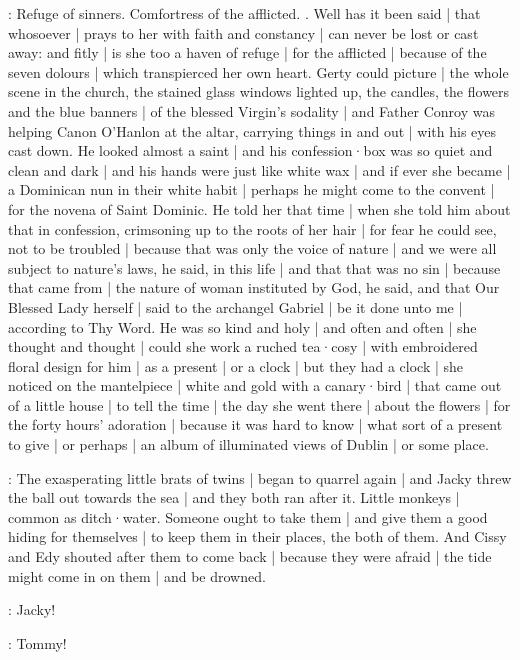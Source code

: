 :
Refuge of sinners.
Comfortress of the afflicted.
.
Well has it been said |
that whosoever |
prays to her with faith and constancy |
can never be lost or cast away:
and fitly |
is she too a haven of refuge |
for the afflicted |
because of the seven dolours |
which transpierced her own heart.
Gerty could picture |
the whole scene in the church,
the stained glass windows lighted up,
the candles,
the flowers
and the blue banners |
of the blessed Virgin's sodality |
and Father Conroy
was helping Canon O'Hanlon at the altar,
carrying things in and out |
with his eyes cast down.
He looked almost a saint |%
and his confession·box
was so quiet and clean and dark |
and his hands were just like white wax |
and if ever she became |
a Dominican nun in their white habit |
perhaps he might come to the convent |
for the novena of Saint Dominic.
He told her that time |
when she told him about that in confession,
crimsoning up to the roots of her hair |
for fear he could see,
not to be troubled |
because that was only the voice of nature |
and we were all subject to nature's laws,
he said,
in this life |
and that that was no sin |
because that came from |
the nature of woman instituted by God,
he said,
and that Our Blessed Lady herself |
said to the archangel Gabriel |
be it done unto me |
according to Thy Word.
He was so kind and holy |
and often and often |
she thought and thought |%
could she work a ruched tea·cosy |
with embroidered floral design for him |
as a present |
or a clock |
but they had a clock |
she noticed on the mantelpiece |
white and gold with a canary·bird |
that came out of a little house |
to tell the time |
the day she went there |
about the flowers |
for the forty hours' adoration |
because it was hard to know |
what sort of a present to give |
or perhaps |
an album of illuminated views of Dublin |
or some place.

:
The exasperating little brats of twins |
began to quarrel again |
and Jacky threw the ball out towards the sea |
and they both ran after it.
Little monkeys |
common as ditch·water.
Someone ought to take them |
and give them a good hiding for themselves |
to keep them in their places,
the both of them.%
And Cissy and Edy shouted after them to come back |
because they were afraid |
the tide might come in on them |
and be drowned.

\cissy:
Jacky!

\edy:
Tommy!

